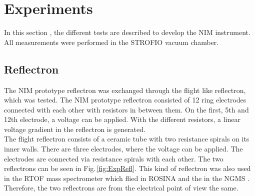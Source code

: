 \section{Experiments}

%

	In this section , the different tests are described to develop the NIM instrument. All measurements were performed in the STROFIO vacuum chamber.
	\subsection{Reflectron}
	
	The NIM prototype reflectron was exchanged through the flight like reflectron, which was tested. The NIM prototype reflectron consisted of 12 ring electrodes connected with each other with resistors in between them. On the first, 5th and 12th electrode, a voltage can be applied. With the different resistors, a linear voltage gradient in the reflectron is generated.\\ %
	The flight reflectron consists of a ceramic tube with two resistance spirals on its inner walls. There are three electrodes, where the voltage can be applied. The electrodes are connected via resistance spirals with each other. The two reflectrons can be seen in Fig.\,\ref{fig:ExpRefl}. This kind of reflectron was also used in the RTOF mass spectrometer which flied in ROSINA \cite{Diss_Scherer} and the in the NGMS \cite{Diss_Hofer}. \\ %
	Therefore, the two reflectrons are from the electrical point of view the same.\\ %
	
